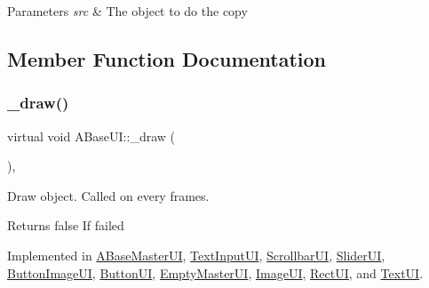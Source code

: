 \begin{DoxyParams}{Parameters}
{\em src} & The object to do the copy \\
\hline
\end{DoxyParams}


\subsection{Member Function Documentation}
\mbox{\label{class_a_base_u_i_a3331159cbf9926557afa79e4e3eee256}} 
\subsubsection{\texorpdfstring{\+\_\+draw()}{\_draw()}}
{\footnotesize\ttfamily virtual void A\+Base\+U\+I\+::\+\_\+draw (\begin{DoxyParamCaption}{ }\end{DoxyParamCaption})\hspace{0.3cm}{\ttfamily [protected]}, {}}



Draw object. Called on every frames. 

\begin{DoxyReturn}{Returns}
false If failed 
\end{DoxyReturn}


Implemented in \hyperlink{class_a_base_master_u_i_ae92346a217da747e894a8acbe39b4397}{A\+Base\+Master\+UI}, \hyperlink{class_text_input_u_i_ab367a04c577afe7fb08ddca20dbcd94b}{Text\+Input\+UI}, \hyperlink{class_scrollbar_u_i_adac2d8cc8f17d8db4170abe7ff9d3dad}{Scrollbar\+UI}, \hyperlink{class_slider_u_i_a62219cde7516ea0e817b7371942ceff3}{Slider\+UI}, \hyperlink{class_button_image_u_i_aea117caa97ce8cb0d888776a9872a405}{Button\+Image\+UI}, \hyperlink{class_button_u_i_aa183e89b7efbc8eed5fc91ce16029725}{Button\+UI}, \hyperlink{class_empty_master_u_i_a1e2b7cba4b43e28713c7e5d34a80b3a7}{Empty\+Master\+UI}, \hyperlink{class_image_u_i_a1c5403c96def58c34362022cb178003a}{Image\+UI}, \hyperlink{class_rect_u_i_a5ad42f50efc75d1f2f516380d1aaaee8}{Rect\+UI}, and \hyperlink{class_text_u_i_a1d4c78e84b108a8b9064c901e8c67d10}{Text\+UI}.

\mbox{\label{class_a_base_u_i_a5941569c008d51d764db097198bba750}} 

